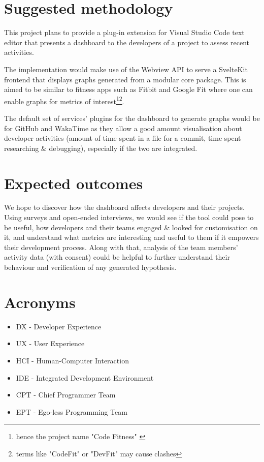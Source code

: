 \documentclass{prrcs}
\begin{document}
\section{Suggested methodology}

This project plans to provide a plug-in extension for Visual Studio Code \cite{VisualStudioCode} text editor that presents a dashboard to the developers of a project to assess recent activities.

The implementation would make use of the Webview API \cite{WebviewAPI} to serve a SvelteKit \cite{SvelteCyberneticallyEnhanced} frontend that displays graphs generated from a modular core package. This is aimed to be similar to fitness apps such as Fitbit \cite{FitbitAppDashboarda} and Google Fit \cite{GoogleFita} where one can enable graphs for metrics of interest\footnote{hence the project name "Code Fitness" \cite{boseCodefitness2022}}\footnote{terms like "CodeFit" or "DevFit" may cause clashes}.

The default set of services' plugins for the dashboard to generate graphs would be for GitHub \cite{GitHubLetBuild} and WakaTime \cite{wakatimeWakaTimeDashboardsDevelopers} as they allow a good amount visualisation about developer activities (amount of time spent in a file for a commit, time spent researching \& debugging), especially if the two are integrated.

\section{Expected outcomes}

We hope to discover how the dashboard affects developers and their projects. Using surveys and open-ended interviews, we would see if the tool could pose to be useful, how developers and their teams engaged \& looked for customisation on it, and understand what metrics are interesting and useful to them if it empowers their development process. Along with that, analysis of the team members' activity data (with consent) could be helpful to further understand their behaviour and verification of any generated hypothesis.

\section*{Acronyms}

\begin{itemize}
    \setlength\itemsep{-0.5em}
    \item DX - Developer Experience
    \item UX - User Experience
    \item HCI - Human-Computer Interaction
    \item IDE - Integrated Development Environment
    \item CPT - Chief Programmer Team
    \item EPT - Ego-less Programming Team
\end{itemize}
\end{document}
